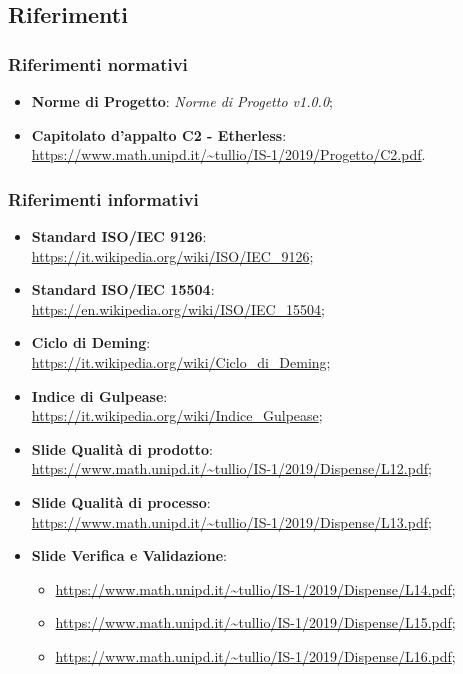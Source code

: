 \subsection{Riferimenti}
	\subsubsection{Riferimenti normativi}
	\begin{itemize}
		\item \textbf{Norme di Progetto}: \textit{Norme di Progetto v1.0.0};
		\item \textbf{Capitolato d'appalto C2 - Etherless}: \\
		\url{https://www.math.unipd.it/~tullio/IS-1/2019/Progetto/C2.pdf}.
	\end{itemize}	
	\subsubsection{Riferimenti informativi}
	\begin{itemize}
		\item \textbf{Standard ISO/IEC 9126}: \\
			\url{https://it.wikipedia.org/wiki/ISO/IEC_9126};
		\item \textbf{Standard ISO/IEC 15504}: \\
			\url{https://en.wikipedia.org/wiki/ISO/IEC_15504};
		\item \textbf{Ciclo di Deming}: \\
			\url{https://it.wikipedia.org/wiki/Ciclo_di_Deming};
		\item \textbf{Indice di Gulpease}: \\
			\url{https://it.wikipedia.org/wiki/Indice_Gulpease};
		\item \textbf{Slide Qualità di prodotto}: \\
			\url{https://www.math.unipd.it/~tullio/IS-1/2019/Dispense/L12.pdf};
		\item \textbf{Slide Qualità di processo}: \\
			\url{https://www.math.unipd.it/~tullio/IS-1/2019/Dispense/L13.pdf};
		\item \textbf{Slide Verifica e Validazione}: 
		\begin{itemize}
			\item \url{https://www.math.unipd.it/~tullio/IS-1/2019/Dispense/L14.pdf}; 
			\item \url{https://www.math.unipd.it/~tullio/IS-1/2019/Dispense/L15.pdf}; 
			\item \url{https://www.math.unipd.it/~tullio/IS-1/2019/Dispense/L16.pdf}; 
		\end{itemize}
		
	\end{itemize}